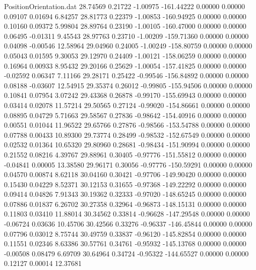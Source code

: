 \begin{filecontents}{PositionOrientation.dat}
  28.74569    0.21722   -1.00975  -161.44222    0.00000    0.00000    0.09107    0.01694    6.84257
  28.81773    0.22379   -1.00853  -160.94925    0.00000    0.00000    0.10160    0.09372    5.99804
  28.89764    0.23190   -1.00105  -160.47000    0.00000    0.00000    0.06495   -0.01311    9.45543
  28.97763    0.23710   -1.00209  -159.71360    0.00000    0.00000    0.04098   -0.00546   12.58964
  29.04960    0.24005   -1.00249  -158.80759    0.00000    0.00000    0.05043    0.01595    9.30053
  29.12970    0.24409   -1.00121  -158.06259    0.00000    0.00000    0.16964    0.00933    8.95432
  29.20166    0.25629   -1.00054  -157.41825    0.00000    0.00000   -0.02592    0.06347    7.11166
  29.28171    0.25422   -0.99546  -156.84892    0.00000    0.00000    0.08188   -0.03607   12.54915
  29.35374    0.26012   -0.99805  -155.94506    0.00000    0.00000    0.10841    0.07954    3.07242
  29.43368    0.26878   -0.99170  -155.69943    0.00000    0.00000    0.03414    0.02078   11.57214
  29.50565    0.27124   -0.99020  -154.86661    0.00000    0.00000    0.08895    0.04729    5.71663
  29.58567    0.27836   -0.98642  -154.40916    0.00000    0.00000    0.00551    0.01044   11.96522
  29.65766    0.27876   -0.98566  -153.54788    0.00000    0.00000    0.07788    0.00433   10.89300
  29.73774    0.28499   -0.98532  -152.67549    0.00000    0.00000    0.02532    0.01364   10.65320
  29.80960    0.28681   -0.98434  -151.90994    0.00000    0.00000    0.21552    0.08216    4.39767
  29.88961    0.30405   -0.97776  -151.55812    0.00000    0.00000   -0.04841    0.00005   13.38580
  29.96171    0.30056   -0.97776  -150.59291    0.00000    0.00000    0.04570    0.00874    8.62118
  30.04160    0.30421   -0.97706  -149.90420    0.00000    0.00000    0.15430    0.04229    8.52371
  30.12153    0.31655   -0.97368  -149.22292    0.00000    0.00000    0.09414    0.04826    7.91343
  30.19362    0.32333   -0.97020  -148.65245    0.00000    0.00000    0.07886    0.01837    6.26702
  30.27358    0.32964   -0.96873  -148.15131    0.00000    0.00000    0.11803    0.03410   11.88014
  30.34562    0.33814   -0.96628  -147.29548    0.00000    0.00000   -0.06724    0.03636   10.45706
  30.42566    0.33276   -0.96337  -146.45844    0.00000    0.00000    0.07796    0.03012    8.75744
  30.49759    0.33837   -0.96120  -145.82854    0.00000    0.00000    0.11551    0.02346    8.63386
  30.57761    0.34761   -0.95932  -145.13768    0.00000    0.00000   -0.00508    0.08479    6.69709
  30.64964    0.34724   -0.95322  -144.65527    0.00000    0.00000    0.12127    0.00014   12.37681

\end{filecontents}
